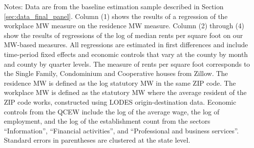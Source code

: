 \begin{table}[hbt!]
    \begin{minipage}{.95\textwidth} \footnotesize
        \vspace{2mm}
        Notes:
        Data are from the baseline estimation sample described in Section 
        \ref{sec:data_final_panel}.
        Column (1) shows the results of a regression of the workplace MW measure
        on the residence MW measure.
        Column (2) through (4) show the results of regressions of the log of 
        median rents per square foot on our MW-based measures.
        All regressions are estimated in first differences and include 
        time-period fixed effects and economic controls that vary at the 
        county by month and county by quarter levels.
        The measure of rents per square foot corresponds to the Single Family, 
        Condominium and Cooperative houses from Zillow.
        The residence MW is defined as the log statutory MW in the same ZIP code.
        The workplace MW is defined as the statutory MW where the average 
        resident of the ZIP code works, constructed using LODES 
        origin-destination data.
        Economic controls from the QCEW include the log of the average wage, 
        the log of employment, and the log of the establishment count from the 
        sectors ``Information'', ``Financial activities'', and ``Professional
        and business services''.
        Standard errors in parentheses are clustered at the state level.
    \end{minipage}
\end{table}
